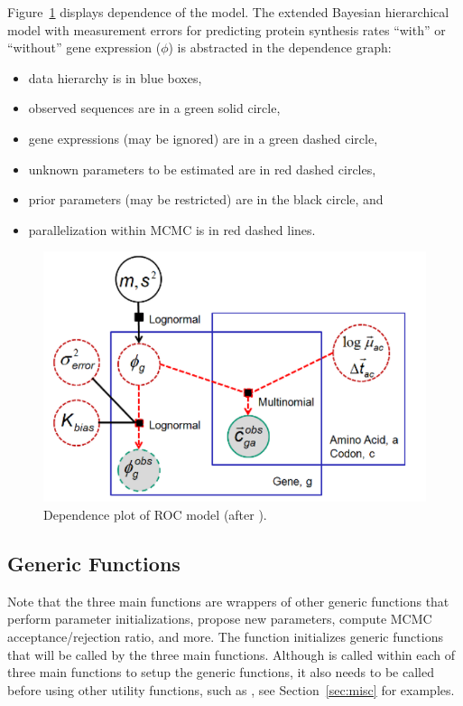 Figure~\ref{fig:bayesian_model} displays dependence of the model.
The extended Bayesian hierarchical model with measurement errors
for predicting protein synthesis rates ``with'' or ``without''
gene expression ($\phi$) is abstracted in the dependence graph:
\begin{itemize}
\item
data hierarchy is in blue boxes,
\item
observed sequences are in a green solid circle, 
\item
gene expressions (may be ignored) are in a green dashed circle,
\item
unknown parameters to be estimated are in red dashed circles,
\item
prior parameters (may be restricted) are in the black circle, and
\item
parallelization within MCMC is in red dashed lines.
\end{itemize}
\begin{figure}[ht]
\centering
\includegraphics[width=5.5in]{cubfits-include/figure/bayesian_model}
\caption{Dependence plot of ROC model (after \citep{Wallace2013}).}
\label{fig:bayesian_model}
\end{figure}



\subsection[Generic Functions]{Generic Functions}
\label{sec:generic_functions}

Note that the three main functions are wrappers of other generic functions that
perform parameter initializations, propose new parameters, compute
MCMC acceptance/rejection ratio, and more.
The function  initializes generic functions that
will be called by the three main functions.
Although  is called within each of three main
functions to setup the generic functions, it also needs to be called before
using other utility functions, such as , see
Section~\ref{sec:misc} for examples.

